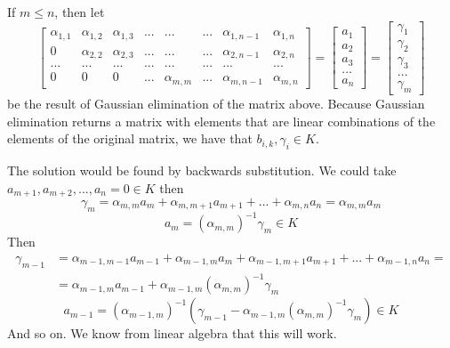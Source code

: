 \documentclass{article}
\begin{document}
If $m\leq n$, then let
$$\begin{bmatrix}
    \alpha_{1, 1}&\alpha_{1, 2}&\alpha_{1, 3}&...&...&...&\alpha_{1, n-1}&\alpha_{1, n}\\
    0&\alpha_{2, 2}&\alpha_{2, 3}&...&...&...&\alpha_{2, n-1}&\alpha_{2, n}\\
    ...     &   ...    & ...      &...&...&... & ...       & ...\\
    0&0&0&...&\alpha_{m, m}&...&\alpha_{m, n-1}&\alpha_{m, n}
\end{bmatrix}=\begin{bmatrix}
    a_1\\a_2\\a_3\\...\\a_n
\end{bmatrix}=\begin{bmatrix}
    \gamma_1\\\gamma_2\\\gamma_3\\...\\\gamma_m
\end{bmatrix}$$
be the result of Gaussian elimination of the matrix above. Because Gaussian elimination returns a matrix with elements that are linear combinations of the elements of the original matrix, we have that $b_{i, k}, \gamma_i\in K$.

The solution would be found by backwards substitution. We could take $a_{m+1},a_{m+2},...,a_n=0\in K$ then
$$\gamma_m=\alpha_{m, m}a_m+\alpha_{m, m+1}a_{m+1}+...+\alpha_{m, n}a_n=\alpha_{m, m}a_m$$
$$a_m=(\alpha_{m, m})^{-1}\gamma_m\in K$$
Then
\begin{align*}
    \gamma_{m-1}&=\alpha_{m-1, m-1}a_{m-1}+\alpha_{m-1, m}a_m+\alpha_{m-1, m+1}a_{m+1}+...+\alpha_{m-1, n}a_n=\\
    &=\alpha_{m-1,m}a_{m-1}+\alpha_{m-1,m}(\alpha_{m,m})^{-1}\gamma_m
\end{align*}
$$a_{m-1}=(\alpha_{m-1,m})^{-1}(\gamma_{m-1}-\alpha_{m-1,m}(\alpha_{m,m})^{-1}\gamma_m)\in K$$
And so on. We know from linear algebra that this will work.
\end{document}
